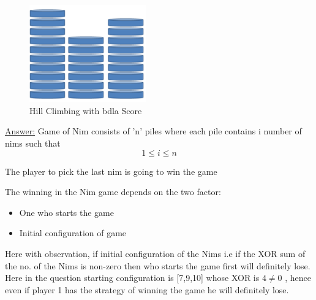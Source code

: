 \documentclass[15pt,journal]{IEEEtran}
\begin{document}
\begin{figure}[H]%
\begin {center}
\includegraphics[width=0.45\textwidth]{images/Nim2.png}
\caption{ Hill Climbing with bdla Score} 
\label{fig:ecg}
\end {center}
\end{figure}

\underline{Answer:}
Game of Nim consists of 'n' piles where each pile contains i number of nims such that
\begin{equation}
   1 \leq i \leq n
    \label{equation: No of Nim }
\end{equation}

The player to pick the last nim is going to win the game

The winning in the Nim game depends on the two factor:
\begin{itemize}
    \item One who starts the game
    \item Initial configuration of game
\end{itemize}

Here with observation, if initial configuration of the Nims i.e if the XOR sum of the no. of the Nims is non-zero then who starts the game first will definitely lose. Here in the question starting configuration is [7,9,10] whose XOR is $4 \neq 0$ , hence even if player 1 has the strategy of winning the game he will definitely lose.
\end{document}
